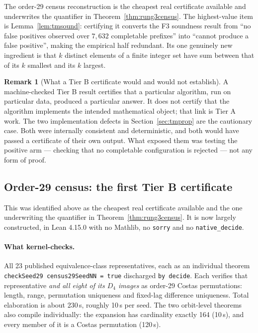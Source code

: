 \documentclass[11pt,a4paper]{article}
\theoremstyle{definition}
\newtheorem{remark}[theorem]{Remark}
\begin{document}
The order-29 census reconstruction is the cheapest real certificate available and
underwrites the quantifier in Theorem~\ref{thm:rung3census}. The highest-value
item is Lemma~\ref{lem:tmsound}: certifying it converts the F3 soundness result
from ``no false positives observed over $7{,}632$ completable prefixes'' into
``cannot produce a false positive'', making the empirical half redundant. Its one
genuinely new ingredient is that $k$ distinct elements of a finite integer set
have sum between that of its $k$ smallest and its $k$ largest.

\begin{remark}[What a Tier B certificate would and would not establish]
\label{rem:tierb}
A machine-checked Tier B result certifies that a particular algorithm, run on
particular data, produced a particular answer. It does not certify that the
algorithm implements the intended mathematical object; that link is Tier A work.
The two implementation defects in Section~\ref{sec:tmprop} are the cautionary
case. Both were internally consistent and deterministic, and both would have
passed a certificate of their own output. What exposed them was testing the
positive arm --- checking that no completable configuration is rejected --- not
any form of proof.
\end{remark}

\subsection{Order-29 census: the first Tier B certificate}
\label{sec:census29lean}

This was identified above as the cheapest real certificate available and the one
underwriting the quantifier in Theorem~\ref{thm:rung3census}. It is now largely
constructed, in Lean 4.15.0 with no Mathlib, no \texttt{sorry} and no
\texttt{native\_decide}.

\paragraph{What kernel-checks.} All 23 published equivalence-class
representatives, each as an individual theorem
\texttt{checkSeed29 census29SeedNN = true} discharged \texttt{by decide}. Each
verifies that representative \emph{and all eight of its $D_4$ images} as order-29
Costas permutations: length, range, permutation uniqueness and fixed-lag
difference uniqueness. Total elaboration is about 230\,s, roughly 10\,s per seed.
The two orbit-level theorems also compile individually: the expansion has
cardinality exactly 164 (10\,s), and every member of it is a Costas permutation
(120\,s).
\end{document}
